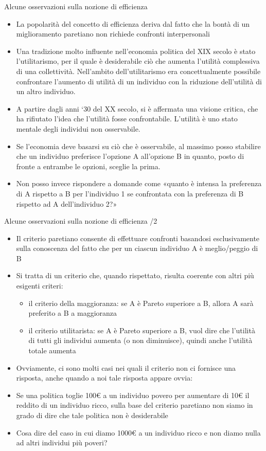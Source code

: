 \documentclass[aspectratio=64,11pt]{beamer}
\begin{document}
\begin{frame}{Alcune osservazioni sulla nozione di efficienza}
\begin{itemize}
\item La popolarità del concetto di efficienza deriva dal fatto che la bontà di un miglioramento paretiano non richiede confronti interpersonali
\item Una tradizione molto influente nell’economia politica del XIX secolo è stato l’utilitarismo, per il quale è desiderabile ciò che aumenta l’utilità complessiva di una collettività. Nell’ambito dell’utilitarismo era concettualmente possibile confrontare l’aumento di utilità di un individuo con la riduzione dell’utilità di un altro individuo.
\item A partire dagli anni ‘30 del XX secolo, si è affermata una visione critica, che ha rifiutato l’idea che l’utilità fosse confrontabile. L’utilità è uno stato mentale degli individui non osservabile.
\item Se l’economia deve basarsi su ciò che è osservabile, al massimo posso stabilire che un individuo preferisce l’opzione A all’opzione B in quanto, posto di fronte a entrambe le opzioni, sceglie la prima.
\item Non posso invece rispondere a domande come «quanto è intensa la preferenza di A rispetto a B per l’individuo 1 se confrontata con la preferenza di B rispetto ad A dell’individuo 2?»
\end{itemize}
\end{frame}

\begin{frame}{Alcune osservazioni sulla nozione di efficienza /2}
\begin{itemize}
\item Il criterio paretiano consente di effettuare confronti basandosi esclusivamente sulla conoscenza del fatto che per un ciascun individuo A è meglio/peggio di B
\item Si tratta di un criterio che, quando rispettato, risulta coerente con altri più esigenti criteri:
\begin{itemize}
\item il criterio della maggioranza: se A è Pareto superiore a B, allora A sarà preferito a B a maggioranza
\item il criterio utilitarista: se A è Pareto superiore a B, vuol dire che l’utilità di tutti gli individui aumenta (o non diminuisce), quindi anche l’utilità totale aumenta
\end{itemize}
\item Ovviamente, ci sono molti casi nei quali il criterio non ci fornisce una risposta, anche quando a noi tale risposta appare ovvia:
\item Se una politica toglie 100€ a un individuo povero per aumentare di 10€ il reddito di un individuo ricco, sulla base del criterio paretiano non siamo in grado di dire che tale politica non è desiderabile
\item Cosa dire del caso in cui diamo 1000€ a un individuo ricco e non diamo nulla ad altri individui più poveri?
\end{itemize}
\end{frame}
\end{document}
